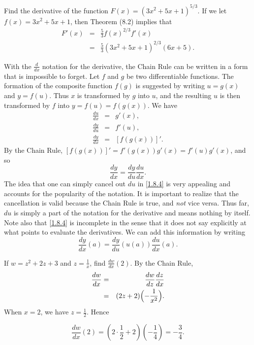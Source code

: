 \begin{example}
\label{exam 1.8.4}
Find the derivative of the function $F(x) = (3x^2 + 5x + 1)^{5/3}$.
If we let $f(x) = 3x^2 + 5x + 1$, then Theorem (8.2) implies that
\begin{eqnarray*}
F'(x)
&=& \frac{5}{3} f(x)^{2/3} f'(x)        \\
&=& \frac{5}{3} (3x^2 + 5x + 1)^{2/3}(6x + 5).
\end{eqnarray*}
\end{example}

With the $\frac{d}{dx}$ notation for the derivative,
the Chain Rule can be written in a form that is impossible to forget.
Let $f$ and $g$ be two differentiable functions.
The formation of the composite function $f(g)$
is suggested by writing $u = g(x)$ and $y = f(u)$.
Thus $x$ is transformed by $g$ into $u$,
and the resulting $u$ is then transformed by
$f$ into $y = f(u) = f(g(x))$.
We have
\begin{eqnarray*}
\frac{du}{dx} &=& g'(x),    \\
\frac{dy}{du} &=& f'(u),     \\
\frac{dy}{dx} &=& [f(g(x))]'.
\end{eqnarray*}
By the Chain Rule,
$[f(g(x))]' = f'(g(x))g'(x) = f'(u)g'(x)$,
and so
\begin{equation}
\frac{dy}{dx} = \frac{dy}{du}\frac{du}{dx}. 
\label{eq1.8.4}
\end{equation}
The idea that one can simply cancel out $du$
in \eqref{1.8.4}
is very appealing
and accounts for the popularity of the notation.
It is important to realize that the cancellation is valid
because the Chain Rule is true, and \emph{not} vice versa.
Thus far, $du$ is simply a part of the notation for the derivative
and means nothing by itself.
Note also that \eqref{1.8.4}
is incomplete
in the sense that it does not say explicitly
at what points to evaluate the derivatives.
We can add this information by writing
$$
\frac{dy}{dx} (a) = \frac{dy}{du} (u(a)) \frac{du}{dx}(a).
$$

\begin{example}
\label{exam 1.8.5}
If $w = z^2 + 2z + 3$ and $z = \frac{1}{x}$,
find $\frac{dw}{dx}(2)$. By the Chain Rule,
\begin{eqnarray*}
\frac{dw}{dx} &=& \frac{dw}{dz} \frac{dz}{dx}      \\
                     &=& (2z + 2) \Bigl( - \frac{1}{x^2} \Bigr).
\end{eqnarray*}
When $x = 2$, we have $z = \frac {1}{2}$. Hence 

$$
\frac{dw}{dx} (2) = (2 \cdot \frac{1}{2} + 2)( -\frac{1}{4}) = - \frac{3}{4}.
$$
\end{example}

